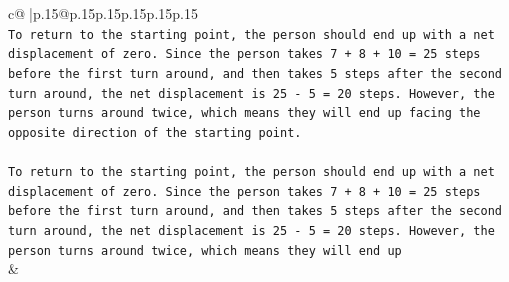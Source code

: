 \documentclass{article}
\begin{document}
{\begin{supertabular}{c@{$\;$}|p{.15\linewidth}@{}p{.15\linewidth}p{.15\linewidth}p{.15\linewidth}p{.15\linewidth}p{.15\linewidth}}
{{{\\ 
\texttt{To return to the starting point, the person should end up with a net displacement of zero. Since the person takes 7 + 8 + 10 = 25 steps before the first turn around, and then takes 5 steps after the second turn around, the net displacement is 25 {-} 5 = 20 steps. However, the person turns around twice, which means they will end up facing the opposite direction of the starting point. } \\
\\ 
\texttt{To return to the starting point, the person should end up with a net displacement of zero. Since the person takes 7 + 8 + 10 = 25 steps before the first turn around, and then takes 5 steps after the second turn around, the net displacement is 25 {-} 5 = 20 steps. However, the person turns around twice, which means they will end up} \\
            }
        }
    }
    & \\ \\

\end{supertabular}
}
\end{document}

